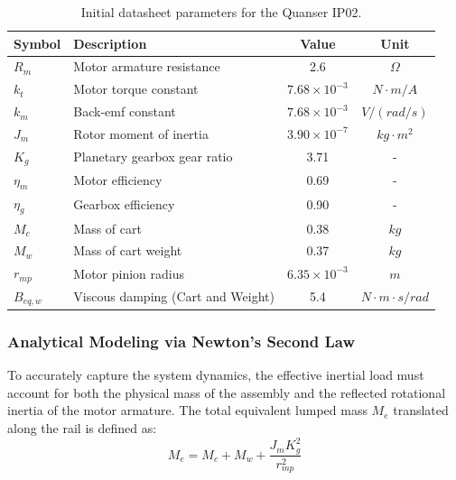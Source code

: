 \documentclass[11pt,a4paper]{article}
\begin{document}
\begin{table}[H]
\caption*{\textbf{IP02 Linear Base Unit Physical Parameters}}
\centering
\begin{tabular}{|p{5em} l c c |}
\hline
\rowcolor{bluePoli!40}
\textbf{Symbol} & \textbf{Description} & \textbf{Value} & \textbf{Unit} \T\B \\
\hline \hline
$R_{m}$ & Motor armature resistance & 2.6 & $\Omega$ \T\B \\
$k_{t}$ & Motor torque constant & $7.68\times10^{-3}$ & $N \cdot m/A$ \T\B \\
$k_{m}$ & Back-emf constant & $7.68\times10^{-3}$ & $V/(rad/s)$ \T\B \\
$J_{m}$ & Rotor moment of inertia & $3.90\times10^{-7}$ & $kg \cdot m^{2}$ \T\B \\
$K_{g}$ & Planetary gearbox gear ratio & 3.71 & - \T\B \\
$\eta_{m}$ & Motor efficiency & 0.69 & - \T\B \\
$\eta_{g}$ & Gearbox efficiency & 0.90 & - \T\B \\
$M_{c}$ & Mass of cart & 0.38 & $kg$ \T\B \\
$M_{w}$ & Mass of cart weight & 0.37 & $kg$ \T\B \\
$r_{mp}$ & Motor pinion radius & $6.35\times10^{-3}$ & $m$ \T\B \\
$B_{eq,w}$ & Viscous damping (Cart and Weight) & 5.4 & $N \cdot m \cdot s/rad$ \B \\
\hline
\end{tabular}
\caption{Initial datasheet parameters for the Quanser IP02.}
\label{table:datasheet_cart}
\end{table}

\subsubsection{Analytical Modeling via Newton's Second Law}\label{subsub:cart_newton}

To accurately capture the system dynamics, the effective inertial load must account for both the physical mass of the assembly and the reflected rotational inertia of the motor armature. The total equivalent lumped mass $M_e$ translated along the rail is defined as:
\begin{equation}
	M_e = M_c + M_w + \frac{J_m K_g^2}{r_{mp}^2}
\end{equation}
\end{document}
